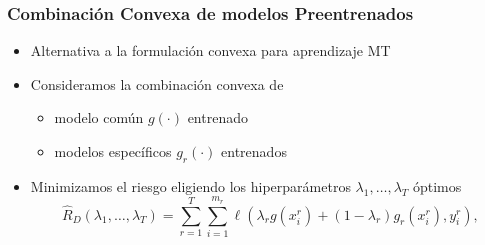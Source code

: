 \documentclass[aspectratio=43]{beamer}
\newcommand{\ntasks}{T}
\newcommand{\npertask}{m}
\newcommand{\lossf}{\ell}
\newcommand{\sample}{D}
\newcommand{\risk}{R}
\newcommand{\emprisk}{\hat{\risk}_{\sample}}
\begin{document}
\begin{frame}
      \frametitle{Combinación Convexa de modelos Preentrenados}

      \begin{itemize}
            \item Alternativa a la formulación convexa para aprendizaje MT
            \item Consideramos la combinación convexa de
            \begin{itemize}
                  \item modelo común $g(\cdot)$ entrenado
                  \item modelos específicos $g_r(\cdot)$ entrenados
            \end{itemize}
            \item Minimizamos el riesgo eligiendo los hiperparámetros $\lambda_1, \ldots, \lambda_\ntasks$ óptimos
            \begin{equation}
                  \nonumber
                  \emprisk(\lambda_1, \ldots, \lambda_\ntasks) = \sum_{r=1}^\ntasks \sum_{i=1}^{\npertask_r} \lossf(\lambda_r g(x_i^r) + (1 - \lambda_r) g_r(x_i^r), y_i^r) ,
              \end{equation}

      \end{itemize}

\end{frame}
\end{document}
